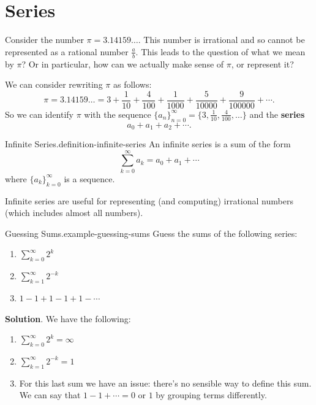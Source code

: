\documentclass[10pt,]{book}
\newcommand{\terminology}[1]{\textbf{#1}}
\numberwithin{equation}{section}
\begin{document}
\section[{Series}]{Series}\label{section-series}
\hypertarget{p-826}{}%
Consider the number \(\pi = 3.14159\ldots\). This number is irrational and so cannot be represented as a rational number \(\frac{a}{b}\). This leads to the question of what we mean by \(\pi\)? Or in particular, how can we actually make sense of \(\pi\), or represent it?%
\par
\hypertarget{p-827}{}%
We can consider rewriting \(\pi\) as follows:%
\begin{equation*}
\pi = 3.14159\ldots = 3 + \frac{1}{10} + \frac{4}{100} + \frac{1}{1000} + \frac{5}{10000} + \frac{9}{100000} + \cdots\text{.}
\end{equation*}
So we can identify \(\pi\) with the sequence \(\{a_{n}\}_{n=0}^{\infty} = \{3, \frac{1}{10}, \frac{4}{100}, \ldots\}\) and the \terminology{series}%
\begin{equation*}
a_{0} + a_{1} + a_{2} + \cdots\text{.}
\end{equation*}
%
\begin{definition}{Infinite Series.}{definition-infinite-series}%
\hypertarget{p-828}{}%
An infinite series is a sum of the form%
\begin{equation*}
\sum_{k=0}^{\infty}a_{k} = a_{0} + a_{1} + \cdots
\end{equation*}
where \(\{a_{k}\}_{k=0}^{\infty}\) is a sequence.%
\end{definition}
\hypertarget{p-829}{}%
Infinite series are useful for representing (and computing) irrational numbers (which includes almost all numbers).%
\begin{example}{Guessing Sums.}{example-guessing-sums}%
\hypertarget{p-830}{}%
Guess the sums of the following series: \leavevmode%
\begin{enumerate}
\item\hypertarget{li-88}{}\(\sum_{k=0}^{\infty}2^{k}\)%
\item\hypertarget{li-89}{}\(\sum_{k=1}^{\infty}2^{-k}\)%
\item\hypertarget{li-90}{}\(1 - 1 + 1 - 1 + 1 - \cdots\)%
\end{enumerate}
%
\par\smallskip%
\noindent\textbf{Solution}.\hypertarget{solution-171}{}\quad%
\hypertarget{p-831}{}%
We have the following: \leavevmode%
\begin{enumerate}
\item\hypertarget{li-91}{}\(\sum_{k=0}^{\infty}2^{k} = \infty\)%
\item\hypertarget{li-92}{}\(\sum_{k=1}^{\infty}2^{-k} = 1\)%
\item\hypertarget{li-93}{}\hypertarget{p-832}{}%
For this last sum we have an issue: there's no sensible way to define this sum. We can say that \(1 - 1 + \cdots = 0\) or \(1\) by grouping terms differently.%
\end{enumerate}
%
\end{example}
\end{document}
